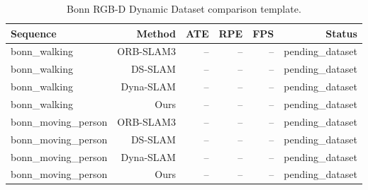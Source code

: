\begin{table}[t]
\centering
\caption{Bonn RGB-D Dynamic Dataset comparison template.}
\label{tab:bonn_comparison}
\begin{tabular}{lrrrrr}
\toprule
Sequence & Method & ATE & RPE & FPS & Status \\
\midrule
bonn_walking & ORB-SLAM3 & -- & -- & -- & pending_dataset \\
bonn_walking & DS-SLAM & -- & -- & -- & pending_dataset \\
bonn_walking & Dyna-SLAM & -- & -- & -- & pending_dataset \\
bonn_walking & Ours & -- & -- & -- & pending_dataset \\
bonn_moving_person & ORB-SLAM3 & -- & -- & -- & pending_dataset \\
bonn_moving_person & DS-SLAM & -- & -- & -- & pending_dataset \\
bonn_moving_person & Dyna-SLAM & -- & -- & -- & pending_dataset \\
bonn_moving_person & Ours & -- & -- & -- & pending_dataset \\
\bottomrule
\end{tabular}
\end{table}
